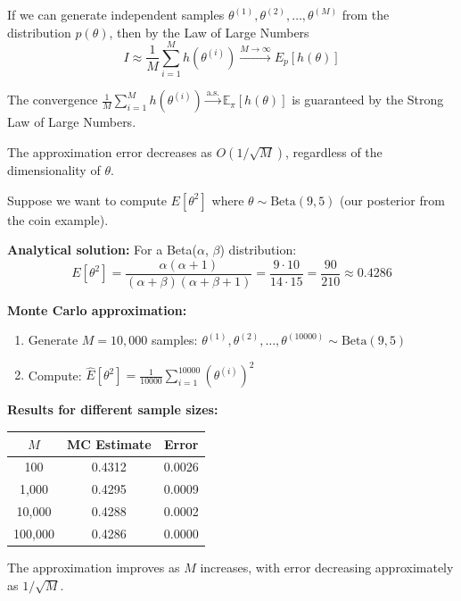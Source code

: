 If we can generate independent samples $\theta^{(1)}, \theta^{(2)}, \dots, \theta^{(M)}$ from the distribution $p(\theta)$, then by the Law of Large Numbers
\begin{equation}
\boxed{I \approx \frac{1}{M} \sum_{i=1}^M h(\theta^{(i)}) \xrightarrow{M \to \infty} E_p[h(\theta)]}
\end{equation}

The convergence \(\frac{1}{M}\sum_{i=1}^{M} h(\theta^{(i)}) \xrightarrow{\text{a.s.}} \mathbb{E}_{\pi}[h(\theta)]\) is guaranteed by the Strong Law of Large Numbers.

The approximation error decreases as $O(1/\sqrt{M})$, regardless of the dimensionality of $\theta$.

\begin{examplebox}
\begin{example}
Suppose we want to compute $E[\theta^2]$ where $\theta \sim \text{Beta}(9,5)$ (our posterior from the coin example).

\textbf{Analytical solution:}
For a Beta($\alpha$, $\beta$) distribution:
$$E[\theta^2] = \frac{\alpha(\alpha+1)}{(\alpha+\beta)(\alpha+\beta+1)} = \frac{9 \cdot 10}{14 \cdot 15} = \frac{90}{210} \approx 0.4286$$

\textbf{Monte Carlo approximation:}
\begin{enumerate}
\item Generate $M = 10{,}000$ samples: $\theta^{(1)}, \theta^{(2)}, \dots, \theta^{(10000)} \sim \text{Beta}(9,5)$
\item Compute: $\hat{E}[\theta^2] = \frac{1}{10000}\sum_{i=1}^{10000} (\theta^{(i)})^2$
\end{enumerate}

\textbf{Results for different sample sizes:}
\begin{center}
\begin{tabular}{ccc}
\toprule
$M$ & MC Estimate & Error \\
\midrule
100 & 0.4312 & 0.0026 \\
1,000 & 0.4295 & 0.0009 \\
10,000 & 0.4288 & 0.0002 \\
100,000 & 0.4286 & 0.0000 \\
\bottomrule
\end{tabular}
\end{center}
The approximation improves as $M$ increases, with error decreasing approximately as $1/\sqrt{M}$.
\end{example}
\end{examplebox}

